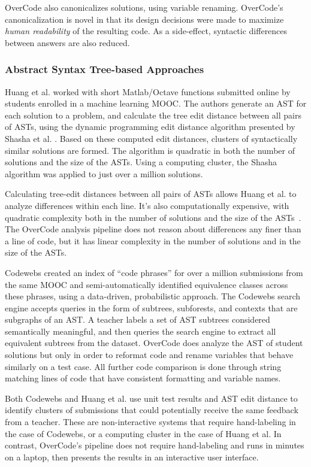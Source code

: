 OverCode also canonicalizes solutions, using variable renaming. OverCode’s canonicalization is novel in that its design decisions were made to maximize {\it human readability} of the resulting code. As a side-effect, syntactic differences between answers are also reduced.

\subsubsection{Abstract Syntax Tree-based Approaches}

Huang et al. \citeyear{MOOCshop} worked with short Matlab/Octave functions submitted online by students enrolled in a machine learning MOOC. The authors generate an AST for each solution to a problem, and calculate the tree edit distance between all pairs of ASTs, using the dynamic programming edit distance algorithm presented by Shasha et al. \citeyear{shasha1994exact}. Based on these computed edit distances, clusters of syntactically similar solutions are formed. The algorithm is quadratic in both the number of solutions and the size of the ASTs. Using a computing cluster, the Shasha algorithm was applied to just over a million solutions. 

Calculating tree-edit distances between all pairs of ASTs allows Huang et al. to analyze differences within each line. It’s also computationally expensive, with quadratic complexity both in the number of solutions and the size of the ASTs~\cite{MOOCshop}. The OverCode analysis pipeline does not reason about differences any finer than a line of code, but it has linear complexity in the number of solutions and in the size of the ASTs.

Codewebs \cite{codewebs} created an index of ``code phrases'' for over a million submissions from the same MOOC and semi-automatically identified equivalence classes across these phrases, using a data-driven, probabilistic approach. The Codewebs search engine accepts queries in the form of subtrees, subforests, and contexts that are subgraphs of an AST. A teacher labels a set of AST subtrees considered semantically meaningful, and then queries the search engine to extract all equivalent subtrees from the dataset. OverCode does analyze the AST of student solutions but only in order to reformat code and rename variables that behave similarly on a test case. All further code comparison is done through string matching lines of code that have consistent formatting and variable names.

Both Codewebs \cite{codewebs} and Huang et al. \citeyear{MOOCshop} use unit test results and AST edit distance to identify clusters of submissions that could potentially receive the same feedback from a teacher. These are non-interactive systems that require hand-labeling in the case of Codewebs, or a computing cluster in the case of Huang et al. In contrast, OverCode’s pipeline does not require hand-labeling and runs in minutes on a laptop, then presents the results in an interactive user interface.

